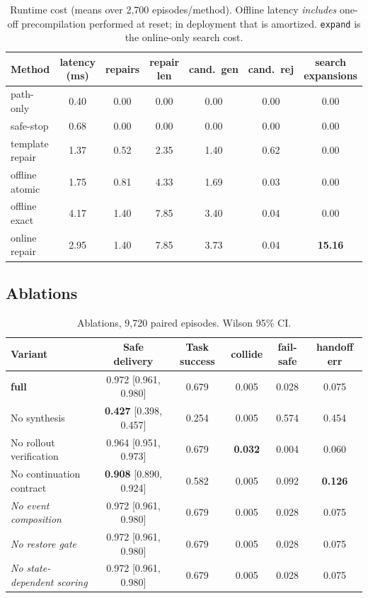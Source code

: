 \documentclass[11pt]{article}
\begin{document}
\begin{table}[htbp]\centering
\caption{Runtime cost (means over 2{,}700 episodes/method). Offline latency
\emph{includes} one-off precompilation performed at reset; in deployment that is
amortized. \texttt{expand} is the online-only search cost.}
\begin{tabular}{lcccccc}
\toprule
Method & latency (ms) & repairs & repair len & cand.\ gen & cand.\ rej & search expansions \\
\midrule
path-only        & 0.40 & 0.00 & 0.00 & 0.00 & 0.00 & 0.00 \\
safe-stop        & 0.68 & 0.00 & 0.00 & 0.00 & 0.00 & 0.00 \\
template repair  & 1.37 & 0.52 & 2.35 & 1.40 & 0.62 & 0.00 \\
offline atomic   & 1.75 & 0.81 & 4.33 & 1.69 & 0.03 & 0.00 \\
offline exact    & 4.17 & 1.40 & 7.85 & 3.40 & 0.04 & 0.00 \\
online repair    & 2.95 & 1.40 & 7.85 & 3.73 & 0.04 & \textbf{15.16} \\
\bottomrule
\end{tabular}
\end{table}

\subsection{Ablations}

\begin{table}[htbp]\centering
\caption{Ablations, 9{,}720 paired episodes. Wilson 95\% CI.}
\begin{tabular}{lccccc}
\toprule
Variant & Safe delivery & Task success & collide & fail-safe & handoff err \\
\midrule
\textbf{full}              & 0.972 [0.961, 0.980] & 0.679 & 0.005 & 0.028 & 0.075 \\
No synthesis               & \textbf{0.427} [0.398, 0.457] & 0.254 & 0.005 & 0.574 & 0.454 \\
No rollout verification    & 0.964 [0.951, 0.973] & 0.679 & \textbf{0.032} & 0.004 & 0.060 \\
No continuation contract   & \textbf{0.908} [0.890, 0.924] & 0.582 & 0.005 & 0.092 & \textbf{0.126} \\
\midrule
\emph{No event composition}      & 0.972 [0.961, 0.980] & 0.679 & 0.005 & 0.028 & 0.075 \\
\emph{No restore gate}           & 0.972 [0.961, 0.980] & 0.679 & 0.005 & 0.028 & 0.075 \\
\emph{No state-dependent scoring}& 0.972 [0.961, 0.980] & 0.679 & 0.005 & 0.028 & 0.075 \\
\bottomrule
\end{tabular}
\end{table}
\end{document}
